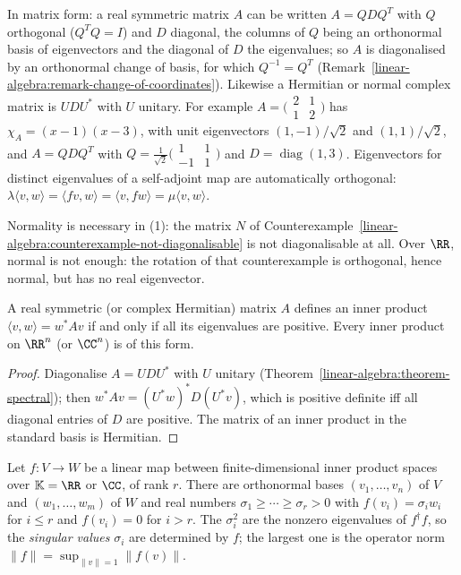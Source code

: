 In matrix form: a real symmetric matrix $A$ can be written $A = QDQ^T$ with $Q$ orthogonal ($Q^TQ = I$) and $D$ diagonal, the columns of $Q$ being an orthonormal basis of eigenvectors and the
diagonal of $D$ the eigenvalues; so $A$ is diagonalised by an orthonormal change of basis, for which $Q^{-1} = Q^T$ (Remark~\ref{linear-algebra:remark-change-of-coordinates}). Likewise a Hermitian
or normal complex matrix is $UDU^*$ with $U$ unitary. For example $A = \bigl(\begin{smallmatrix}2 & 1\\ 1 & 2\end{smallmatrix}\bigr)$ has $\chi_A = (x - 1)(x - 3)$, with unit eigenvectors
$(1, -1)/\sqrt2$ and $(1, 1)/\sqrt2$, and $A = QDQ^T$ with $Q = \frac1{\sqrt2}\bigl(\begin{smallmatrix}1 & 1\\ -1 & 1\end{smallmatrix}\bigr)$ and $D = \operatorname{diag}(1, 3)$. Eigenvectors for
distinct eigenvalues of a self-adjoint map are automatically orthogonal: $\lambda\langle v, w\rangle = \langle fv, w\rangle = \langle v, fw\rangle = \mu\langle v, w\rangle$.

\begin{counterexample}\label{linear-algebra:counterexample-spectral}
Normality is necessary in (1): the matrix $N$ of
Counterexample~\ref{linear-algebra:counterexample-not-diagonalisable} is not diagonalisable at all. Over $\RR$,
normal is not enough: the rotation of that counterexample is orthogonal, hence normal, but has no real
eigenvector.
\end{counterexample}

\begin{corollary}\label{linear-algebra:corollary-positive-definite}
A real symmetric (or complex Hermitian) matrix $A$ defines an inner product $\langle v, w \rangle = w^* A v$ if and only
if all its eigenvalues are positive. Every inner product on $\RR^n$ (or $\CC^n$) is of this form.
\end{corollary}

\begin{proof}
Diagonalise $A = U D U^*$ with $U$ unitary (Theorem~\ref{linear-algebra:theorem-spectral}); then
$w^*Av = (U^*w)^* D (U^*v)$, which is positive definite iff all diagonal entries of $D$ are positive. The
matrix of an inner product in the standard basis is Hermitian.
\end{proof}

\begin{proposition}\label{linear-algebra:proposition-svd}
Let $f \colon V \to W$ be a linear map between finite-dimensional inner product spaces over $\mathbb{K} = \RR$ or $\CC$, of rank $r$. There are orthonormal bases $(v_1, \ldots, v_n)$ of $V$ and $(w_1, \ldots, w_m)$
of $W$ and real numbers $\sigma_1 \geq \cdots \geq \sigma_r > 0$ with $f(v_i) = \sigma_iw_i$ for $i \leq r$ and $f(v_i) = 0$ for $i > r$. The $\sigma_i^2$ are the nonzero eigenvalues of $f^\dagger f$, so the
\emph{singular values} $\sigma_i$ are determined by $f$; the largest one is the operator norm $\|f\| = \sup_{\|v\| = 1}\|f(v)\|$.
\end{proposition}

